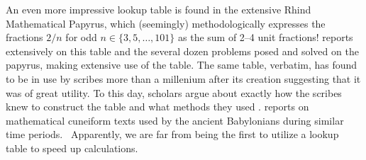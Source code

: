 
An even more impressive lookup table is found in the extensive Rhind Mathematical Papyrus, which (seemingly) methodologically expresses the fractions $2/n$ for odd $n \in \lbrace 3, 5, \dots, 101 \rbrace$ as the sum of 2--4 unit fractions! \citet{Gillings82} reports extensively on this table and the several dozen problems posed and solved on the papyrus, making extensive use of the table. The same table, verbatim, has found to be in use by scribes more than a millenium after its creation suggesting that it was of great utility. To this day, scholars argue about exactly how the scribes knew to construct the table and what methods they used \citep{Gillings74,Abdulaziz08}. \citet{Neugebauer45} reports on mathematical cuneiform texts used by the ancient Babylonians during similar time periods.\footnotemark~ Apparently, we are far from being the first to utilize a lookup table to speed up calculations.



